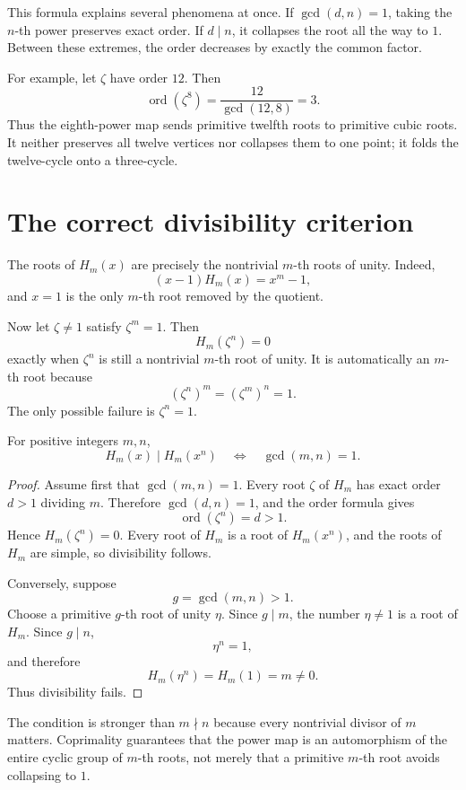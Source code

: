 This formula explains several phenomena at once.  If \(\gcd(d,n)=1\), taking the \(n\)-th power preserves exact order.  If \(d\mid n\), it collapses the root all the way to \(1\).  Between these extremes, the order decreases by exactly the common factor.

For example, let \(\zeta\) have order \(12\).  Then
\[
  \operatorname{ord}(\zeta^8)
  =\frac{12}{\gcd(12,8)}
  =3.
\]
Thus the eighth-power map sends primitive twelfth roots to primitive cubic roots.  It neither preserves all twelve vertices nor collapses them to one point; it folds the twelve-cycle onto a three-cycle.

\section{The correct divisibility criterion}

The roots of \(H_m(x)\) are precisely the nontrivial \(m\)-th roots of unity.  Indeed,
\[
  (x-1)H_m(x)=x^m-1,
\]
and \(x=1\) is the only \(m\)-th root removed by the quotient.

Now let \(\zeta\neq1\) satisfy \(\zeta^m=1\).  Then
\[
  H_m(\zeta^n)=0
\]
exactly when \(\zeta^n\) is still a nontrivial \(m\)-th root of unity.  It is automatically an \(m\)-th root because
\[
  (\zeta^n)^m=(\zeta^m)^n=1.
\]
The only possible failure is \(\zeta^n=1\).

\begin{theorem}
For positive integers \(m,n\),
\[
  H_m(x)\mid H_m(x^n)
  \quad\Longleftrightarrow\quad
  \gcd(m,n)=1.
\]
\end{theorem}

\begin{proof}
Assume first that \(\gcd(m,n)=1\).  Every root \(\zeta\) of \(H_m\) has exact order \(d>1\) dividing \(m\).  Therefore \(\gcd(d,n)=1\), and the order formula gives
\[
  \operatorname{ord}(\zeta^n)=d>1.
\]
Hence \(H_m(\zeta^n)=0\).  Every root of \(H_m\) is a root of \(H_m(x^n)\), and the roots of \(H_m\) are simple, so divisibility follows.

Conversely, suppose
\[
  g=\gcd(m,n)>1.
\]
Choose a primitive \(g\)-th root of unity \(\eta\).  Since \(g\mid m\), the number \(\eta\neq1\) is a root of \(H_m\).  Since \(g\mid n\),
\[
  \eta^n=1,
\]
and therefore
\[
  H_m(\eta^n)=H_m(1)=m\neq0.
\]
Thus divisibility fails.
\end{proof}

The condition is stronger than \(m\nmid n\) because every nontrivial divisor of \(m\) matters.  Coprimality guarantees that the power map is an automorphism of the entire cyclic group of \(m\)-th roots, not merely that a primitive \(m\)-th root avoids collapsing to \(1\).

